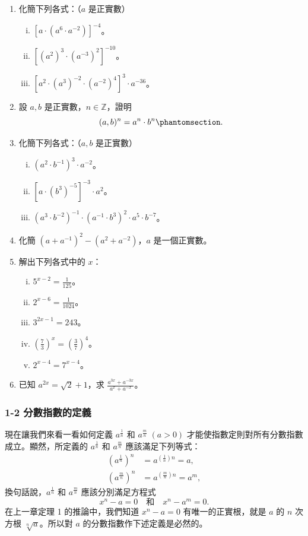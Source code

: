 \begin{enumerate}
    \item 化簡下列各式：（$a$ 是正實數）
    \begin{enumerate}[(i)]
        \item $[a \cdot (a^6 \cdot a^{-2})]^{-4}$。
        \item $[(a^2)^3 \cdot (a^{-3})^2]^{-10}$。
        \item $[a^2 \cdot (a^3)^{-2} \cdot (a^{-2})^4]^3 \cdot a^{-36}$。
    \end{enumerate}
    \item 設 $a, b$ 是正實數，$n \in \mathbb{Z}$，證明
    \[
    (a, b)^n = a^n \cdot b^n\phantomsection\label{note:b2-ch4-p81-comma}.
    \]
    \item 化簡下列各式：（$a, b$ 是正實數）
    \begin{enumerate}[(i)]
        \item $(a^2 \cdot b^{-1})^3 \cdot a^{-2}$。
        \item $[a \cdot (b^3)^{-5}]^{-3} \cdot a^2$。
        \item $(a^3 \cdot b^{-2})^{-1} \cdot (a^{-1} \cdot b^3)^2 \cdot a^5 \cdot b^{-7}$。
    \end{enumerate}
    \item 化簡 $(a+a^{-1})^2 - (a^2+a^{-2})$，$a$ 是一個正實數。
    \item 解出下列各式中的 $x$：
    \begin{enumerate}[(i)]
        \item $5^{x-2} = \frac{1}{125}$。
        \item $2^{x-6} = \frac{1}{1024}$。
        \item $3^{2x-1} = 243$。
        \item $\left(\frac{7}{3}\right)^x = \left(\frac{3}{7}\right)^4$。
        \item $2^{x-4} = 7^{x-4}$。
    \end{enumerate}
    \item 已知 $a^{2x} = \sqrt{2}+1$，求 $\frac{a^{3x}+a^{-3x}}{a^x+a^{-x}}$。
\end{enumerate}

\subsubsection*{1-2 分數指數的定義}

現在讓我們來看一看如何定義 $a^{\frac{1}{n}}$ 和 $a^{\frac{m}{n}}\; (a>0)$ 才能使指數定則對所有分數指數成立。顯然，所定義的 $a^{\frac{1}{n}}$ 和 $a^{\frac{m}{n}}$ 應該滿足下列等式：
\begin{align*}
(a^{\frac{1}{n}})^n &= a^{(\frac{1}{n})n} = a, \\
(a^{\frac{m}{n}})^n &= a^{(\frac{m}{n})n} = a^m,
\end{align*}
換句話說，$a^{\frac{1}{n}}$ 和 $a^{\frac{m}{n}}$ 應該分別滿足方程式
\[
x^n - a = 0 \quad \text{和} \quad x^n - a^m = 0.
\]
在上一章定理 1 的推論中，我們知道 $x^n - a = 0$ 有唯一的正實根，就是 $a$ 的 $n$ 次方根 $\sqrt[n]{a}$。所以對 $a$ 的分數指數作下述定義是必然的。

